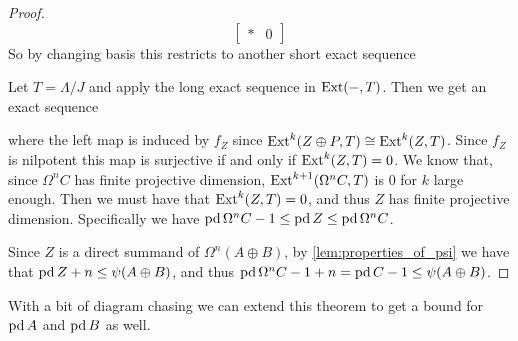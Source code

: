 \begin{theorem}
\begin{proof}
$$\begin{bmatrix}
		* & 0
		\end{bmatrix} $$
		So by changing basis this restricts to another short exact sequence
		\begin{center}
		\end{center}
		Let $T = \Lambda/J$ and apply the long exact sequence in $\operatorname{Ext}(-, T)$. Then we get an exact sequence
		\begin{center}
		\end{center}
		where the left map is induced by $f_Z$ since $\operatorname{Ext}^k(Z \oplus P, T) \cong \operatorname{Ext}^k(Z, T)$. Since $f_Z$ is nilpotent this map is surjective if and only if $\operatorname{Ext}^k(Z, T)=0$. We know that, since $\Omega^nC$ has finite projective dimension, $\operatorname{Ext}^{k+1}(\Omega^n C, T)$ is 0 for $k$ large enough. Then we must have that $\operatorname{Ext}^k(Z, T)=0$, and thus $Z$ has finite projective dimension. Specifically we have $\operatorname{pd}\Omega^n C -1 \leq \operatorname{pd} Z \leq \operatorname{pd}\Omega^n C$.
		
		Since $Z$ is a direct summand of $\Omega^n (A\oplus B)$, by \cref{lem:properties_of_psi} we have that $\operatorname{pd} Z + n \leq \psi(A \oplus B)$, and thus $\operatorname{pd} \Omega^n C - 1 + n = \operatorname{pd} C - 1 \leq \psi(A \oplus B)$.
	\end{proof}
\end{theorem}

With a bit of diagram chasing we can extend this theorem to get a bound for $\operatorname{pd} A$ and $\operatorname{pd} B$ as well.

